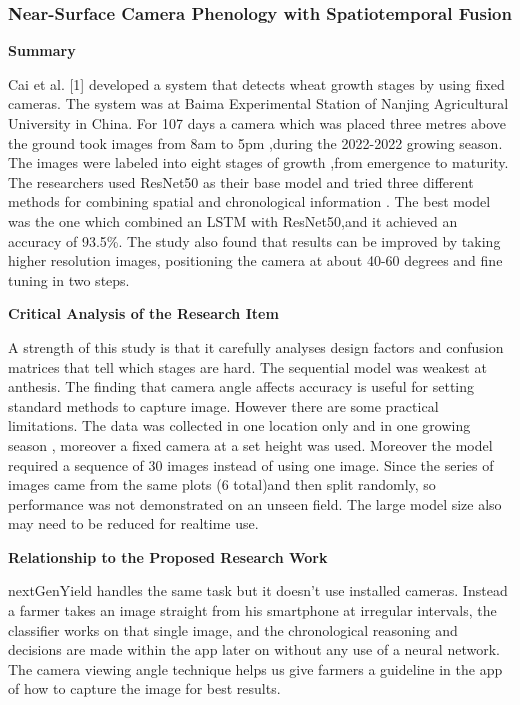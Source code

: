\documentclass{FastFyp}
\begin{document}
\subsubsection{Near-Surface Camera Phenology with Spatiotemporal Fusion}

\textbf{Summary}

Cai et al. [1] developed a system that detects wheat growth stages by using fixed cameras. The system was at Baima Experimental Station of Nanjing Agricultural University in China. For 107 days a camera which was placed three metres above the ground took images from 8am to 5pm ,during the 2022-2022 growing season. The images were labeled into eight stages of growth ,from emergence to maturity. The researchers used ResNet50 as their base model and tried three different methods for combining spatial and chronological information . The best model was the one which combined an LSTM with ResNet50,and it achieved an accuracy of 93.5\%. The study also found that results can be improved by taking higher resolution images, positioning the camera at about 40-60 degrees and fine tuning in two steps.

\textbf{Critical Analysis of the Research Item}

A strength of this study is that it carefully analyses design factors and confusion matrices that tell which stages are hard. The sequential model was weakest at anthesis. The finding that camera angle affects accuracy is useful for setting standard methods to capture image. However there are some practical limitations. The data was collected in one location only and in one growing season , moreover a fixed camera at a set height was used. Moreover the model required a sequence of 30 images instead of using one image. Since the series of images came from the same plots (6 total)and then split randomly, so performance was not demonstrated on an unseen field. The large model size also may need to be reduced for realtime use.

\textbf{Relationship to the Proposed Research Work}

nextGenYield handles the same task but it doesn't use installed cameras. Instead a farmer takes an image straight from his smartphone at irregular intervals, the classifier works on that single image, and the chronological reasoning and decisions are made within the app later on without any use of a neural network. The camera viewing angle technique helps us give farmers a guideline in the app of how to capture the image for best results.
\end{document}
